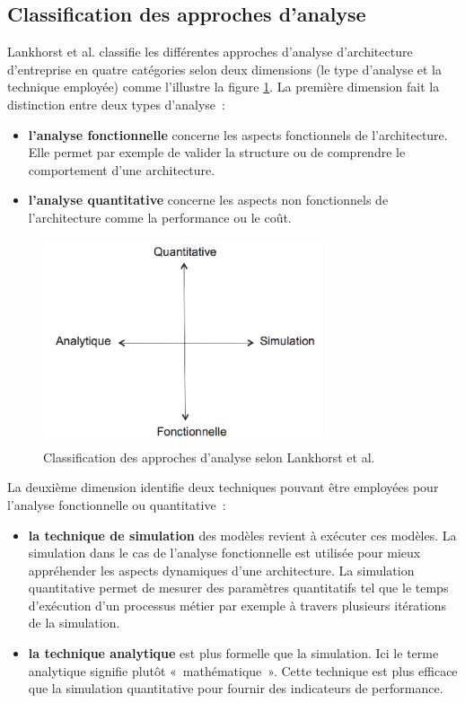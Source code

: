 	\subsection{Classification des approches d'analyse}
Lankhorst et al. \cite{lankhorst2013enterprise} classifie les différentes approches d'analyse d'architecture d'entreprise en quatre catégories selon deux dimensions (le type d'analyse et la technique employée) comme l'illustre la figure \ref{fig:classLankhorst}. La première dimension fait la distinction entre deux types d'analyse~:
	\begin{itemize}
		\item \textbf{l'analyse fonctionnelle} concerne les aspects fonctionnels de l'architecture. Elle permet par exemple de valider la structure ou de comprendre le comportement d'une architecture.
		\item \textbf{l'analyse quantitative} concerne les aspects non fonctionnels de l'architecture comme la performance ou le coût. 
\end{itemize}

\begin{figure}[!htbp]
 \begin{center}
  \includegraphics[width=0.75\textwidth]{images/Chapitre1/dimesionsLankhorts.png}
 \end{center}
 \caption{Classification des approches d'analyse selon Lankhorst et al. \protect\cite{lankhorst2013enterprise}}
 \label{fig:classLankhorst}
\end{figure}

La deuxième dimension identifie deux techniques pouvant être employées pour l'analyse fonctionnelle ou quantitative~:
	\begin{itemize}
		\item \textbf{la technique de simulation} des modèles revient à exécuter ces modèles. La simulation dans le cas de l'analyse fonctionnelle est utilisée pour mieux appréhender les aspects dynamiques d'une architecture. La simulation quantitative permet de mesurer des paramètres quantitatifs tel que le temps d'exécution d'un processus métier par exemple à travers plusieurs itérations de la simulation. 
		\item \textbf{la technique analytique} est plus formelle que la simulation. Ici le terme analytique signifie plutôt «~mathématique~». Cette technique est plus efficace que la simulation quantitative pour fournir des indicateurs de performance.  
	\end{itemize}
	
